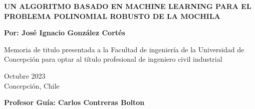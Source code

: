 \documentclass[spanish, a4paper, 12pt, twoside, openany,final]{book}
\numberwithin{equation}{section}
\def\biblio{\clearpage} %
\begin{document}
\def\biblio{}   %

\begin{titlepage}
	
	
	\thispagestyle{frontpage}
	
	\begin{center}
		
		\vspace*{4\baselineskip}
		
		
		{\Huge \textbf{UN ALGORITMO BASADO EN MACHINE LEARNING PARA EL PROBLEMA POLINOMIAL ROBUSTO DE LA MOCHILA\\}}
		\vspace*{1.5\baselineskip}
		
		
		\vspace*{1,5\baselineskip}
		
		\large{\textbf{Por: José Ignacio González Cortés}}\\
		
		\vspace{1,5\baselineskip}
		
		\large{Memoria de titulo presentada a la Facultad de ingeniería de la Universidad de Concepción para optar al título profesional de ingeniero civil industrial} 
		
		\vspace{1,5\baselineskip}
		Octubre 2023\\ %
		Concepción, Chile %
		\vspace{1,5\baselineskip}
		
		\large{\textbf{Profesor Guía: Carlos Contreras Bolton}}\\
		
	\end{center}
	
	\vspace*{4\baselineskip}
	
\end{titlepage}


\vfill

\end{document}
